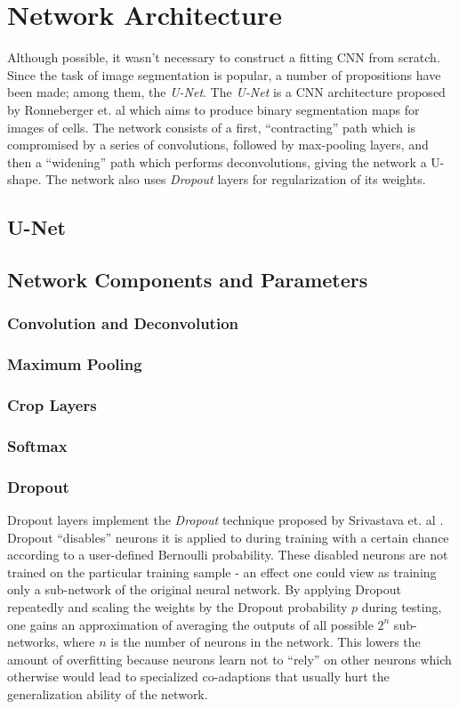 \chapter {Network Architecture}
Although possible, it wasn't necessary to construct a fitting CNN from scratch. Since the task of image segmentation is popular, a number of propositions have been made; among them, the \textit{U-Net}. The \textit{U-Net} is a CNN architecture proposed by Ronneberger et. al\cite{unet} which aims to produce binary segmentation maps for images of cells. The network consists of a first, ``contracting'' path which is compromised by a series of convolutions, followed by max-pooling layers, and then a ``widening'' path which performs deconvolutions, giving the network a U-shape. The network also uses \textit{Dropout} layers\cite{dropout} for regularization of its weights.

	\section {U-Net}

	\section {Network Components and Parameters}
	
		\subsection{Convolution and Deconvolution}
		\subsection{Maximum Pooling}
		\subsection {Crop Layers}
		\subsection{Softmax}

		\subsection {Dropout}
Dropout layers implement the \textit{Dropout} technique proposed by Srivastava et. al \cite{dropout}. Dropout ``disables'' neurons it is applied to during training with a certain chance according to a user-defined Bernoulli probability. These disabled neurons are not trained on the particular training sample - an effect one could view as training only a sub-network of the original neural network. By applying Dropout repeatedly and scaling the weights by the Dropout probability $p$ during testing, one gains an approximation of averaging the outputs of all possible $2^n$ sub-networks, where $n$ is the number of neurons in the network. This lowers the amount of overfitting because neurons learn not to ``rely'' on other neurons which otherwise would lead to specialized co-adaptions that usually hurt the generalization ability of the network.

